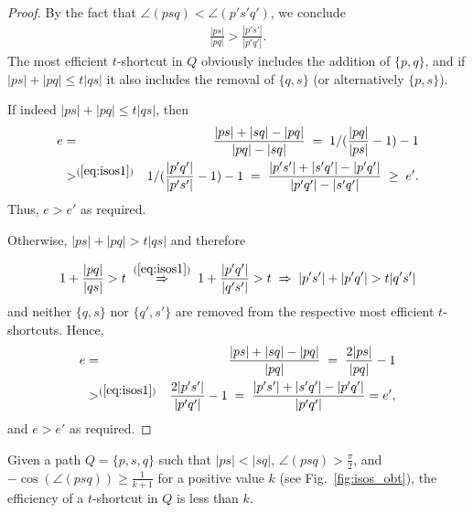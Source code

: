 \documentclass[a4paper]{llncs}
\begin{document}
\begin{proof}
By the fact that $\angle(psq)<\angle(p's'q')$, we conclude 
\begin{eqnarray}\label{eq:isos1}
\frac{|ps|}{|pq|}>\frac{|p's'|}{|p'q'|}.
\end{eqnarray}
The most efficient $t$-shortcut in $Q$ obviously includes the addition of $\{p,q\}$, 
and if $|ps|+|pq|\leq t|qs|$ it also includes the removal of $\{q,s\}$ (or alternatively $\{p,s\}$). 

If indeed $|ps|+|pq|\leq t|qs|$, then 
\begin{eqnarray*}
e &=& \frac{|ps|+|sq|-|pq|}{|pq|-|sq|} 
  \;=\; 1/(\frac{|pq|}{|ps|}-1)-1  \\
	&>^{(\ref{eq:isos1})}& 1/(\frac{|p'q'|}{|p's'|}-1)-1 
	\;=\; \frac{|p's'|+|s'q'|-|p'q'|}{|p'q'|-|s'q'|} \;\geq\; e'.
\end{eqnarray*}
Thus, $e>e'$ as required. 

Otherwise, $|ps|+|pq|> t|qs|$ and therefore 

\begin{eqnarray*}
 1+\frac{|pq|}{|qs|}> t 
 \;\overset{(\ref{eq:isos1})}\Rightarrow \; 1+\frac{|p'q'|}{|q's'|}> t 
 \;	\Rightarrow \; |p's'|+|p'q'|> t|q's'|
\end{eqnarray*}
and neither $\{q,s\}$ nor $\{q',s'\}$ are removed from the respective most efficient $t$-shortcuts. 
Hence, 
\begin{eqnarray*}
e&=& \frac{|ps|+|sq|-|pq|}{|pq|}
 \;=\;  \frac{2|ps|}{|pq|}-1\\
 &>^{(\ref{eq:isos1})}& \frac{2|p's'|}{|p'q'|}-1 
 \;=\; \frac{|p's'|+|s'q'|-|p'q'|}{|p'q'|} = e',
\end{eqnarray*}
and $e>e'$ as required. 

\end{proof}






\begin{lemma}\label{lem:obt}
Given a path $Q=\{p,s,q\}$ such that $|ps|<|sq|$, $\angle(psq)>\frac{\pi}{2}$, and 
$-\cos(\angle(psq))\geq \frac{1}{k+1}$ for a positive value $k$ (see Fig.~\ref{fig:isos_obt}), 
the efficiency of a $t$-shortcut in $Q$ is less than $k$.
\end{lemma}
\end{document}
